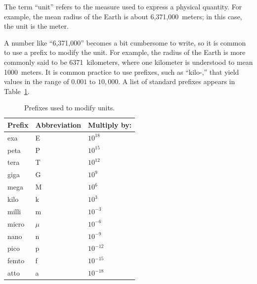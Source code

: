 

\label{m0072_Units} %

The term ``unit'' refers to the measure used to express a physical quantity.
For example, the mean radius of the Earth is about 6,371,000~meters; in this case, the unit is the meter.

A number like ``6,371,000'' becomes a bit cumbersome to write, so it is common to use a prefix to modify the unit.
For example, the radius of the Earth is more commonly said to be 6371~kilometers, where one kilometer is understood to mean 1000~meters. 
It is common practice to use prefixes, such as ``kilo-,'' that yield values in the range of $0.001$ to $10,000$.  
A list of standard prefixes appears in Table~\ref{m0072_tPrefix}.
%
\begin{table}[b!]
\begin{center}
\begin{tabular}{lll}
Prefix & Abbreviation & Multiply by: \\
\hline
exa & E & $10^{18}$ \\
peta & P & $10^{15}$ \\
tera & T & $10^{12}$ \\
giga & G & $10^{9}$ \\
mega & M & $10^{6}$ \\
kilo & k & $10^{3}$ \\
milli & m & $10^{-3}$ \\
micro & $\mu$ & $10^{-6}$ \\
nano & n & $10^{-9}$ \\
pico & p & $10^{-12}$ \\
femto & f & $10^{-15}$ \\
atto & a & $10^{-18}$ \\
\end{tabular}
\end{center}
\caption{Prefixes used to modify units.}
\label{m0072_tPrefix}
\end{table}

